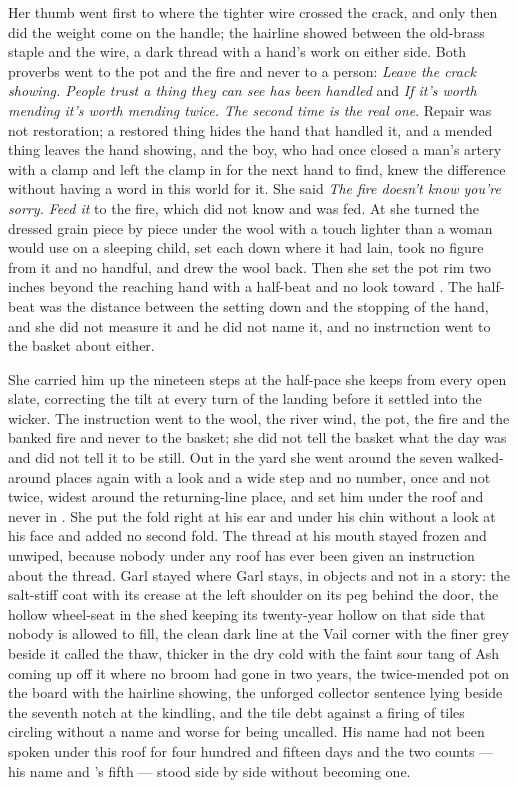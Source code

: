 Her thumb went first to where the tighter wire crossed the crack, and only then did the weight come on the handle; the hairline showed between the old-brass staple and the wire, a dark thread with a hand's work on either side. Both proverbs went to the pot and the fire and never to a person: \emph{Leave the crack showing. People trust a thing they can see has been handled} and \emph{If it's worth mending it's worth mending twice. The second time is the real one}. Repair was not restoration; a restored thing hides the hand that handled it, and a mended thing leaves the hand showing, and the boy, who had once closed a man's artery with a clamp and left the clamp in for the next hand to find, knew the difference without having a word in this world for it. She said \emph{The fire doesn't know you're sorry. Feed it} to the fire, which did not know and was fed. At  she turned the dressed grain piece by piece under the wool with a touch lighter than a woman would use on a sleeping child, set each down where it had lain, took no figure from it and no handful, and drew the wool back. Then she set the pot rim two inches beyond the reaching hand with a half-beat and no look toward . The half-beat was the distance between the setting down and the stopping of the hand, and she did not measure it and he did not name it, and no instruction went to the basket about either.

She carried him up the nineteen steps at the half-pace she keeps from every open slate, correcting the tilt at every turn of the landing before it settled into the wicker. The instruction went to the wool, the river wind, the pot, the fire and the banked fire and never to the basket; she did not tell the basket what the day was and did not tell it to be still. Out in the yard she went around the seven walked-around places again with a look and a wide step and no number, once and not twice, widest around the returning-line place, and set him under the roof and never in . She put the fold right at his ear and under his chin without a look at his face and added no second fold. The thread at his mouth stayed frozen and unwiped, because nobody under any roof has ever been given an instruction about the thread. Garl stayed where Garl stays, in objects and not in a story: the salt-stiff coat with its crease at the left shoulder on its peg behind the door, the hollow wheel-seat in the shed keeping its twenty-year hollow on that side that nobody is allowed to fill, the clean dark line at the Vail corner with the finer grey beside it called the thaw, thicker in the dry cold with the faint sour tang of Ash coming up off it where no broom had gone in two years, the twice-mended pot on the board with the hairline showing, the unforged collector sentence lying beside the seventh notch at the kindling, and the tile debt against a firing of tiles circling without a name and worse for being uncalled. His name had not been spoken under this roof for four hundred and fifteen days and the two counts --- his name and 's fifth --- stood side by side without becoming one.

